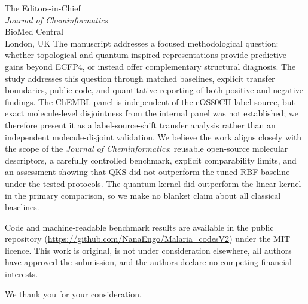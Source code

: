 \documentclass[11pt,a4paper]{letter}
\begin{document}
\begin{letter}{%
  The Editors-in-Chief \\
  \textit{Journal of Cheminformatics} \\
  BioMed Central \\
  London, UK
}
The manuscript addresses a focused methodological question: whether topological and quantum-inspired representations provide predictive gains beyond ECFP4, or instead offer complementary structural diagnosis. The study addresses this question through matched baselines, explicit transfer boundaries, public code, and quantitative reporting of both positive and negative findings. The ChEMBL panel is independent of the eOS80CH label source, but exact molecule-level disjointness from the internal panel was not established; we therefore present it as a label-source-shift transfer analysis rather than an independent molecule-disjoint validation. We believe the work aligns closely with the scope of the \textit{Journal of Cheminformatics}: reusable open-source molecular descriptors, a carefully controlled benchmark, explicit comparability limits, and an assessment showing that QKS did not outperform the tuned RBF baseline under the tested protocols. The quantum kernel did outperform the linear kernel in the primary comparison, so we make no blanket claim about all classical baselines.

Code and machine-readable benchmark results are available in the public repository (\url{https://github.com/NanaEngo/Malaria_codesV2}) under the MIT licence. This work is original, is not under consideration elsewhere, all authors have approved the submission, and the authors declare no competing financial interests.

\closing{We thank you for your consideration.}

\end{letter}
\end{document}
